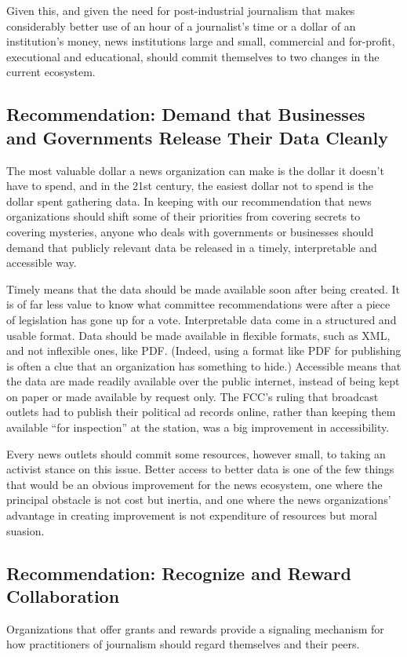 Given this, and given the need for post-industrial journalism that makes considerably
better use of an hour of a journalist’s time or a dollar of an institution’s
money, news institutions large and small, commercial and for-profit,
executional and educational, should commit themselves to two changes in the
current ecosystem.

\subsection{Recommendation: Demand that Businesses and Governments Release
Their Data Cleanly}
The most valuable dollar a news organization can make is the dollar it
doesn’t have to spend, and in the 21st century, the easiest dollar not to
spend is the dollar spent gathering data. In keeping with our recommendation
that news organizations should shift some of their priorities
from covering secrets to covering mysteries, anyone who deals with
governments or businesses should demand that publicly relevant data
be released in a timely, interpretable and accessible way.

Timely means that the data should be made available soon after being
created. It is of far less value to know what committee recommendations
were after a piece of legislation has gone up for a vote. Interpretable
data come in a structured and usable format. Data should be made
available in flexible formats, such as XML, and not inflexible ones, like
PDF. (Indeed, using a format like PDF for publishing is often a clue
that an organization has something to hide.) Accessible means that the
data are made readily available over the public internet, instead of being
kept on paper or made available by request only. The FCC’s ruling that
broadcast outlets had to publish their political ad records online, rather
than keeping them available ``for inspection'' at the station, was a big
improvement in accessibility.

Every news outlets should commit some resources, however small, to
taking an activist stance on this issue. Better access to better data is one
of the few things that would be an obvious improvement for the news
ecosystem, one where the principal obstacle is not cost but inertia, and
one where the news organizations’ advantage in creating improvement
is not expenditure of resources but moral suasion.

\subsection{Recommendation: Recognize and Reward Collaboration}
Organizations that offer grants and rewards provide a signaling mechanism
for how practitioners of journalism should regard themselves and
their peers.

